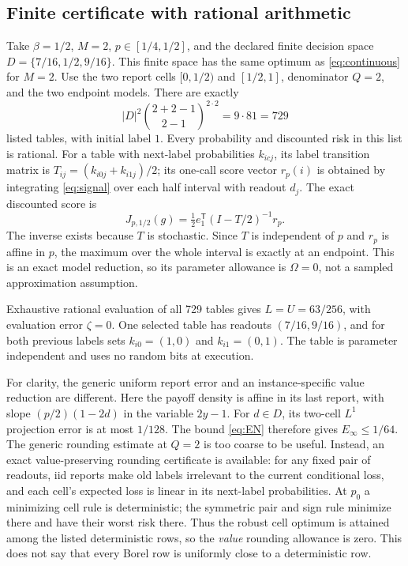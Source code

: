 \subsection{Finite certificate with rational arithmetic}
Take $\beta=1/2$, $M=2$, $p\in[1/4,1/2]$, and the declared finite decision space
$D=\{7/16,1/2,9/16\}$. This finite space has the same optimum as \eqref{eq:continuous} for $M=2$. Use the two report cells $[0,1/2)$ and $[1/2,1]$, denominator $Q=2$, and the two endpoint models. There are exactly
\[
       |D|^2 {2+2-1\choose2-1}^{2\cdot2}=9\cdot81=729
\]
listed tables, with initial label $1$. Every probability and discounted risk in this list is rational. For a table with next-label probabilities $k_{icj}$, its label transition matrix is $T_{ij}=(k_{i0j}+k_{i1j})/2$; its one-call score vector $r_p(i)$ is obtained by integrating \eqref{eq:signal} over each half interval with readout $d_j$. The exact discounted score is
\begin{equation}\label{eq:rational}
 J_{p,1/2}(g)=\tfrac12 e_1^{\mathsf T}(I-T/2)^{-1}r_p.
\end{equation}
The inverse exists because $T$ is stochastic. Since $T$ is independent of $p$ and $r_p$ is affine in $p$, the maximum over the whole interval is exactly at an endpoint. This is an exact model reduction, so its parameter allowance is $\Omega=0$, not a sampled approximation assumption.

Exhaustive rational evaluation of all 729 tables gives $L=U=63/256$, with evaluation error $\zeta=0$. One selected table has readouts $(7/16,9/16)$, and for both previous labels sets $k_{i0}=(1,0)$ and $k_{i1}=(0,1)$. The table is parameter independent and uses no random bits at execution.

For clarity, the generic uniform report error and an instance-specific value reduction are different. Here the payoff density is affine in its last report, with slope $(p/2)(1-2d)$ in the variable $2y-1$. For $d\in D$, its two-cell $L^1$ projection error is at most $1/128$. The bound \eqref{eq:EN} therefore gives $E_\infty\le1/64$. The generic rounding estimate at $Q=2$ is too coarse to be useful. Instead, an exact value-preserving rounding certificate is available: for any fixed pair of readouts, iid reports make old labels irrelevant to the current conditional loss, and each cell's expected loss is linear in its next-label probabilities. At $p_0$ a minimizing cell rule is deterministic; the symmetric pair and sign rule minimize there and have their worst risk there. Thus the robust cell optimum is attained among the listed deterministic rows, so the \emph{value} rounding allowance is zero. This does not say that every Borel row is uniformly close to a deterministic row.

